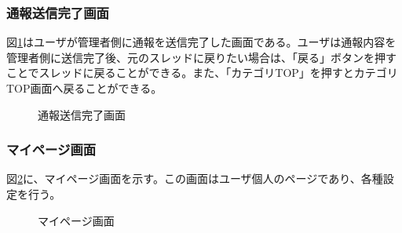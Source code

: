 \documentclass[a4j]{jarticle}
\begin{document}
\subsubsection{通報送信完了画面}
図\ref{fig:report_ok}はユーザが管理者側に通報を送信完了した画面である。ユーザは通報内容を管理者側に送信完了後、元のスレッドに戻りたい場合は、「戻る」ボタンを押すことでスレッドに戻ることができる。また、「カテゴリTOP」を押すとカテゴリTOP画面へ戻ることができる。
\begin{figure}[H]
\begin{center}
\caption{通報送信完了画面}
\label{fig:report_ok}
\end{center}
\end{figure}


\subsubsection{マイページ画面}
図\ref{fig:mypage}に、マイページ画面を示す。この画面はユーザ個人のページであり、各種設定を行う。\\

\begin{figure}[H]
\centering
{}
\caption{マイページ画面}
\label{fig:mypage}
\end{figure}
\end{document}
